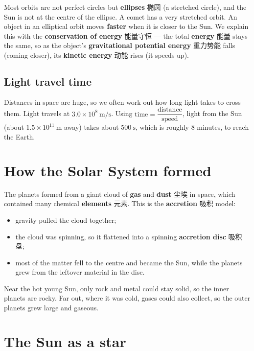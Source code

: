 \documentclass[11pt]{article}
\begin{document}
Most orbits are not perfect circles but \textbf{ellipses} 椭圆 (a stretched circle), and the Sun is not at the centre of the ellipse. A comet has a very stretched orbit. An object in an elliptical orbit moves \textbf{faster} when it is closer to the Sun. We explain this with the \textbf{conservation of energy} 能量守恒 — the total \textbf{energy} 能量 stays the same, so as the object's \textbf{gravitational potential energy} 重力势能 falls (coming closer), its \textbf{kinetic energy} 动能 rises (it speeds up).

\subsection*{Light travel time}

Distances in space are huge, so we often work out how long light takes to cross them. Light travels at $3.0 \times 10^8\ \text{m/s}$. Using $\text{time} = \dfrac{\text{distance}}{\text{speed}}$, light from the Sun (about $1.5 \times 10^{11}\ \text{m}$ away) takes about $500\ \text{s}$, which is roughly $8$ minutes, to reach the Earth.

\section*{How the Solar System formed}

The planets formed from a giant cloud of \textbf{gas} and \textbf{dust} 尘埃 in space, which contained many chemical \textbf{elements} 元素. This is the \textbf{accretion} 吸积 model:

\begin{itemize}
\item gravity pulled the cloud together;

\item the cloud was spinning, so it flattened into a spinning \textbf{accretion disc} 吸积盘;

\item most of the matter fell to the centre and became the Sun, while the planets grew from the leftover material in the disc.

\end{itemize}

Near the hot young Sun, only rock and metal could stay solid, so the inner planets are rocky. Far out, where it was cold, gases could also collect, so the outer planets grew large and gaseous.

\section*{The Sun as a star}
\end{document}

